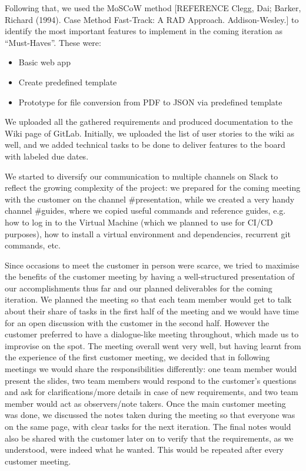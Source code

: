 \documentclass{l3proj}
\begin{document}
Following that, we used the MoSCoW method [REFERENCE Clegg, Dai; Barker, Richard (1994). Case Method Fast-Track: A RAD Approach. Addison-Wesley.] to identify the most important features to implement in the coming iteration as ``Must-Haves''. These were: 
\begin{itemize}
\item Basic web app
\item Create predefined template
\item Prototype for file conversion from PDF to JSON via predefined template
\end{itemize}

We uploaded all the gathered requirements and produced documentation to the Wiki page of GitLab.  Initially, we uploaded the list of user stories to the wiki as well, and we added technical tasks to be done to deliver features to the board with labeled due dates.

We started to diversify our communication to multiple channels on Slack to reflect the growing complexity of the project: we prepared for the coming meeting with the customer on the channel \#presentation, while we created a very handy channel \#guides, where we copied useful commands and reference guides, e.g. how to log in to the Virtual Machine (which we planned to use for CI/CD purposes), how to install a virtual environment and dependencies, recurrent git commands, etc.

Since occasions to meet the customer in person were scarce, we tried to maximise the benefits of the customer meeting by having a well-structured presentation of our accomplishments thus far and our planned deliverables for the coming iteration. We planned the meeting so that each team member would get to talk about their share of tasks in the first half of the meeting and we would have time for an open discussion with the customer in the second half. However the customer preferred to have a dialogue-like meeting throughout, which made us to improvise on the spot. The meeting overall went very well, but having learnt from the experience of the first customer meeting, we decided that in following meetings we would share the responsibilities differently: one team member would present the slides, two team members would respond to the customer’s questions and ask for clarifications/more details in case of new requirements, and two team member would act as observers/note takers. Once the main customer meeting was done, we discussed the notes taken during the meeting so that everyone was on the same page, with clear tasks for the next iteration. The final notes would also be shared with the customer later on to verify that the requirements, as we understood, were indeed what he wanted. This would be repeated after every customer meeting.
\end{document}
